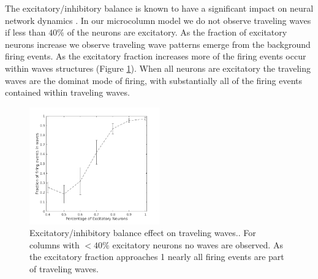 \documentclass[a4paper,11pt]{article}
\begin{document}
The excitatory/inhibitory balance is known to have a significant impact on neural network dynamics \cite{keane2015}. 
In our microcolumn model we do not observe traveling waves if less than $40\%$ of the neurons are excitatory.
As the fraction of excitatory neurons increase we observe traveling wave patterns emerge from the background firing events.
As the excitatory fraction increases more of the firing events occur within waves structures (Figure \ref{fig:excitatory_effect}).
When all neurons are excitatory the traveling waves are the dominat mode of firing, with substantially all of the firing events contained within traveling waves. \\
\begin{figure}[!htb]
 \caption{Excitatory/inhibitory balance effect on traveling waves.. 
	  For columns with $<40\%$ excitatory neurons no waves are observed.
	  As the excitatory fraction approaches 1 nearly all firing events are part of traveling waves.
	  }
 \label{fig:excitatory_effect}
 \centering
   \includegraphics[width=0.5\textwidth]{fig/ExcitatoryWaves}
\end{figure}
\end{document}
